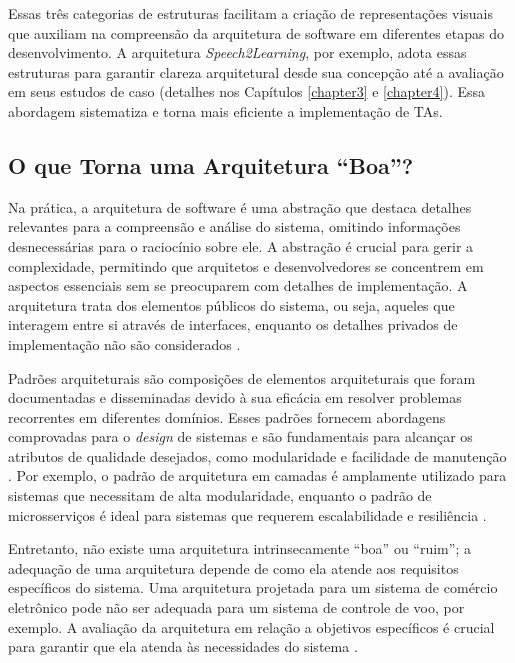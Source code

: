 Essas três categorias de estruturas facilitam a criação de representações visuais que auxiliam na compreensão da arquitetura de software em diferentes etapas do desenvolvimento. A arquitetura \textit{Speech2Learning}, por exemplo, adota essas estruturas para garantir clareza arquitetural desde sua concepção até a avaliação em seus estudos de caso (detalhes nos Capítulos \ref{chapter3} e \ref{chapter4}). Essa abordagem sistematiza e torna mais eficiente a implementação de TAs.

\subsection{O que Torna uma Arquitetura ``Boa''?}

Na prática, a arquitetura de software é uma abstração que destaca detalhes relevantes para a compreensão e análise do sistema, omitindo informações desnecessárias para o raciocínio sobre ele. A abstração é crucial para gerir a complexidade, permitindo que arquitetos e desenvolvedores se concentrem em aspectos essenciais sem se preocuparem com detalhes de implementação. A arquitetura trata dos elementos públicos do sistema, ou seja, aqueles que interagem entre si através de interfaces, enquanto os detalhes privados de implementação não são considerados \cite{Bass2021}.

Padrões arquiteturais são composições de elementos arquiteturais que foram documentadas e disseminadas devido à sua eficácia em resolver problemas recorrentes em diferentes domínios. Esses padrões fornecem abordagens comprovadas para o \textit{design} de sistemas e são fundamentais para alcançar os atributos de qualidade desejados, como modularidade e facilidade de manutenção \cite{Bass2021}. Por exemplo, o padrão de arquitetura em camadas é amplamente utilizado para sistemas que necessitam de alta modularidade, enquanto o padrão de microsserviços é ideal para sistemas que requerem escalabilidade e resiliência \cite{Pressman2016, Sommerville2015}.

Entretanto, não existe uma arquitetura intrinsecamente ``boa'' ou ``ruim''; a adequação de uma arquitetura depende de como ela atende aos requisitos específicos do sistema. Uma arquitetura projetada para um sistema de comércio eletrônico pode não ser adequada para um sistema de controle de voo, por exemplo. A avaliação da arquitetura em relação a objetivos específicos é crucial para garantir que ela atenda às necessidades do sistema \cite{Pressman2016, Sommerville2015}.

